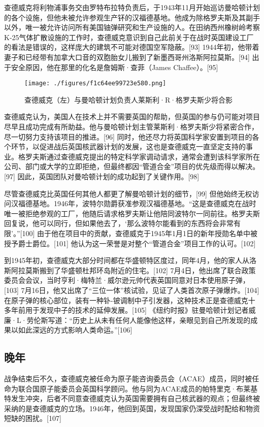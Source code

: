查德威克将利物浦事务交由罗特布拉特负责后，于1943年11月开始巡访曼哈顿计划的各个设施，但他未被允许参观生产钚的汉福德基地。他成为除格罗夫斯及其副手以外，唯一被允许访问所有美国铀弹研究和生产设施的人。在田纳西州橡树岭考察K-25气体扩散设施的工作时，查德威克意识到自己此前关于在战时英国建设工厂的看法是错误的，这样庞大的建筑不可能对德国空军隐蔽。[93] 1944年初，他带着妻子和已经带有加拿大口音的双胞胎女儿搬到了新墨西哥州洛斯阿拉莫斯。[94] 出于安全原因，他在那里的化名是詹姆斯·查菲（James Chaffee）。[95]
\begin{figure}[ht]
\centering
\texttt{[image: ./figures/f1c64ee99723e580.png]}
\caption{查德威克（左）与曼哈顿计划负责人莱斯利·R·格罗夫斯少将合影} \label{fig_ZMcdw_7}
\end{figure}
查德威克认为，美国人在技术上并不需要英国的帮助，但英国的参与仍可能对项目尽早且成功完成有所助益。他与曼哈顿计划主管莱斯利·格罗夫斯少将紧密合作，尽一切努力支持该项目的推进。[96] 同时，他还尽力将英国科学家安置到项目的各个环节，以促进战后英国核武器计划的发展，这也是查德威克一直坚定支持的事业。格罗夫斯通过查德威克提出的特定科学家调动请求，通常会遭到该科学家所在公司、部门或大学的立即拒绝，但最终都因“管道合金”项目的优先级而得以解决。[97] 因此，英国团队对曼哈顿计划的成功起到了关键作用。[98]

尽管查德威克比英国任何其他人都更了解曼哈顿计划的细节，[99] 但他始终无权访问汉福德基地。1946年，波特尔勋爵获准参观汉福德基地。“这是查德威克在战时唯一被拒绝参观的工厂，他随后请求格罗夫斯让他陪同波特尔一同前往。格罗夫斯回复说，他可以同行，但如果他去了，‘那么波特尔能看到的东西将会非常有限’。”[100] 由于他在项目中的贡献，查德威克于1945年1月1日的新年授勋名单中被授予爵士爵位。[101] 他认为这一荣誉是对整个“管道合金”项目工作的认可。[102]

到1945年初，查德威克大部分时间都在华盛顿特区度过，同年4月，他的家人从洛斯阿拉莫斯搬到了华盛顿杜邦环岛附近的住宅。[102] 7月4日，他出席了联合政策委员会会议，当时亨利·梅特兰·威尔逊元帅代表英国同意对日本使用原子弹，[103] 7月16日，他又出席了“三位一体”核试验，见证了人类首次原子弹爆炸。[104] 在原子弹的核心部位，装有一种钋-铍调制中子引发器，这种技术正是查德威克十多年前用于发现中子的技术的延伸发展。[105] 《纽约时报》驻曼哈顿计划记者威廉·L·劳伦斯写道：“历史上从未有任何人能像他这样，亲眼见到自己所发现的成果以如此深远的方式影响人类命运。”[106]
\subsection{晚年}
战争结束后不久，查德威克被任命为原子能咨询委员会（ACAE）成员，同时被任命为联合国原子能委员会英国科学顾问。他与同为ACAE成员的帕特里克·布莱基特发生冲突，后者不同意查德威克认为英国需要拥有自己核武器的观点；但最终被采纳的是查德威克的立场。1946年，他回到英国，发现国家仍深受战时配给和物资短缺的困扰。[107]

